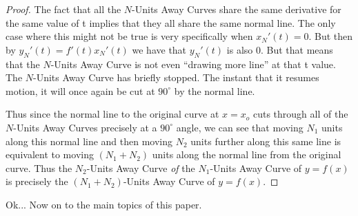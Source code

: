\begin{proof}
    The fact that all the $N$-Units Away Curves share the same derivative for the same value of t implies that they all share the same normal line. The only case where this might not be true is very specifically when $x_N'(t) = 0$. But then by $y_N'(t) = f'(t) x_N'(t)$ we have that $y_N'(t)$ is also 0. But that means that the $N$-Units Away Curve is not even ``drawing more line'' at that t value. The $N$-Units Away Curve has briefly stopped. The instant that it resumes motion, it will once again be cut at $90 ^{\circ}$ by the normal line.
    
    Thus since the normal line to the original curve at $x = x_o$ cuts through all of the $N$-Units Away Curves precisely at a $90^{\circ}$ angle, we can see that moving $N_1$ units along this normal line and then moving $N_2$ units further along this same line is equivalent to moving $(N_1 + N_2)$ units along the normal line from the original curve. Thus the $N_2$-Units Away Curve \textit{of} the $N_1$-Units Away Curve of $y=f(x)$ is precisely the $(N_1 + N_2)$-Units Away Curve of $y = f(x)$.

\end{proof}

Ok... Now on to the main topics of this paper.